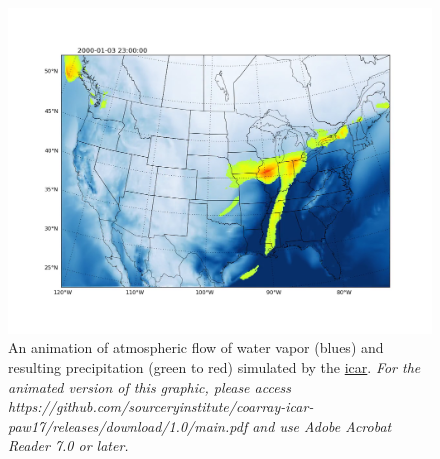 \begin{figure}
   \vspace{-18pt}
   \vbox{\hspace{-24pt}
   \includegraphics[width=1.1\columnwidth]{figures/icar/frames/frame22.png}
   }
   \caption{An animation of atmospheric flow of water vapor (blues) and resulting precipitation (green to red) simulated by the \href{https://github.com/gutmann/icar}{\gls{icar}}. {\it For the animated version of this graphic, please access https://github.com/sourceryinstitute/coarray-icar-paw17/releases/download/1.0/main.pdf and use Adobe Acrobat Reader 7.0 or later.}
\label{figure:icar}}
\end{figure}

